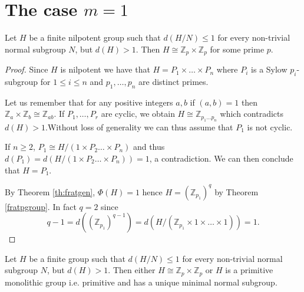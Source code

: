 \section{The case \texorpdfstring{$m=1$}{m=1}}

\begin{theorem}
    \label{nilk1}
    Let $H$ be a finite nilpotent group such that $d(H/N) \le 1$ for every non-trivial normal subgroup $N$, but $d(H) > 1$. Then $H \cong \mathbb{Z}_p \times \mathbb{Z}_p$ for some prime $p$.
\end{theorem}

\begin{proof}
    Since $H$ is nilpotent we have that $H = P_1 \times \ldots  \times P_n$ where $P_i$ is a Sylow $p_i$-subgroup for $1 \le i \le n$ and $p_1,\ldots ,p_n$ are distinct primes.
    
    Let us remember that for any positive integers $a, b$ if $(a, b) = 1$ then $\mathbb{Z}_a \times \mathbb{Z}_b \cong \mathbb{Z}_{ab}$. If $P_1,\ldots , P_r$ are cyclic, we obtain $H \cong \mathbb{Z}_{p_1\ldots p_n}$  which contradicts $d(H) > 1$.Without loss of generality we can thus assume that $P_1$ is not cyclic. 
    
    If $n \ge 2$, $P_1 \cong H/(1 \times P_2 \ldots  \times P_n)$ and thus $d(P_1) = d(H/(1 \times P_2 \ldots  \times P_n)) = 1$, a contradiction. We can then conclude that $H = P_1$.

    By Theorem \ref{th:fratgen}, $\Phi(H) = 1$ hence $H = (\mathbb{Z}_{p_1})^q$ by Theorem \ref{fratpgroup}. 
    In fact $q = 2$ since $$q-1 = d((\mathbb{Z}_{p_1})^{q-1}) = d(H/(\mathbb{Z}_{p_1} \times 1 \times \ldots  \times 1)) = 1.$$
\end{proof}

\begin{theorem}
    Let $H$ be a finite group such that $d(H/N) \le 1$ for every non-trivial normal subgroup $N$, but $d(H) > 1$. Then either $H \cong \mathbb{Z}_p \times \mathbb{Z}_p$ or $H$ is a primitive monolithic group i.e. primitive and has a unique minimal normal subgroup.
\end{theorem}

